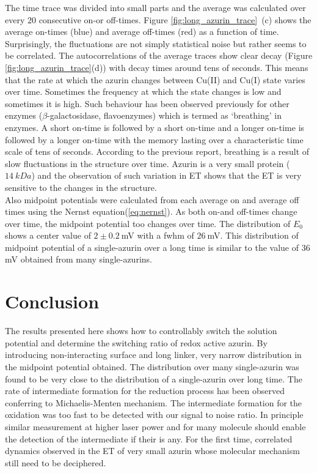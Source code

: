 \documentclass[journal=jacsat,manuscript=article]{achemso}
\begin{document}
The time trace was divided into small parts and the average was calculated over every $20$ consecutive on-or off-times. 
Figure \ref{fig:long_azurin_trace}~(c) shows the average on-times (blue) and average off-times (red) as a function of 
time. Surprisingly, the fluctuations are not simply statistical noise but rather seems to be correlated. 
The autocorrelations of the average traces show clear decay (Figure \ref{fig:long_azurin_trace}(d)) with decay times 
around tens of seconds. This means that the rate at which the azurin changes between Cu(II) and Cu(I) state varies 
over time. Sometimes the frequency at which the state changes is low and sometimes it is high. Such behaviour has been 
observed previously for other enzymes ($\beta$-galactosidase, flavoenzymes)
\cite{lu1998single-molecule,kou2005single-molecule,english2006ever-fluctuating} which is termed as `breathing' 
in enzymes. A short on-time is followed by a short on-time and a longer on-time is followed by a longer on-time with 
the memory lasting over a characteristic time scale of tens of seconds. According to the previous report, breathing 
is a result of slow fluctuations in the structure over time. Azurin is a very small protein ($14~kDa$) and the 
observation of such variation in ET shows that the ET is very sensitive to the changes in the structure.\\

Also midpoint potentials were calculated from each average on and average off times using the Nernst 
equation(\ref{eq:nernst}). As both on-and off-times change over time, the midpoint potential too changes over time. 
The distribution of $E_0$ shows a center value of $2\pm0.2~$mV with a fwhm of $26~$mV. This distribution of midpoint 
potential of a single-azurin over a long time is similar to the value of $36~$mV obtained from many single-azurins.
\section{Conclusion}
The results presented here shows how to controllably switch the solution potential and determine the switching ratio 
of redox active azurin. By introducing non-interacting surface and long linker, very narrow distribution in the 
midpoint potential obtained. The distribution over many single-azurin was found to be very close to the distribution 
of a single-azurin over long time. The rate of intermediate formation for the reduction process has been observed 
conferring to Michaelis-Menten mechanism. The intermediate formation for the oxidation was too fast to be detected 
with our signal to noise ratio. In principle similar measurement at higher laser power and for many molecule should 
enable the detection of the intermediate if their is any. For the first time, correlated dynamics observed in the ET 
of very small azurin whose molecular mechanism still need to be deciphered.
% 
\pagebreak

\end{document}
